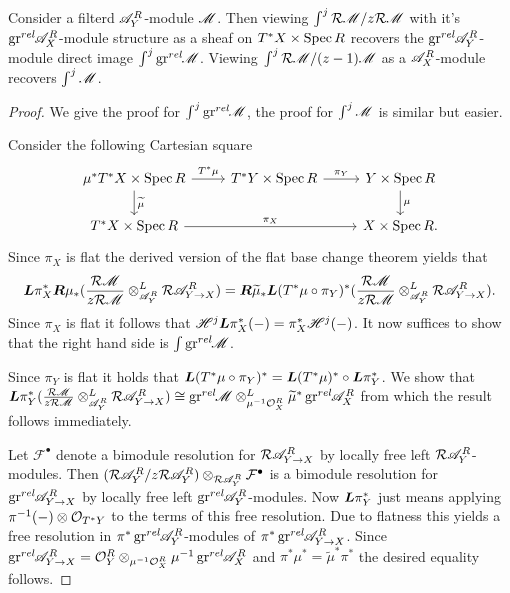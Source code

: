 \begin{lemma}\label{lem: ReesAndOtherDirectImagesAgree}
  Consider a filterd $\mathscr{A}_Y^R$-module $\mathscr{M}$. Then viewing $\int^j \mathcal{R}\mathscr{M} / z\mathcal{R}\mathscr{M}$ with it's $\operatorname{gr}^{rel}\mkern-5mu\mathscr{A}_X^R$-module structure as a sheaf on $T^*X\times \operatorname{Spec} R$ recovers the $\operatorname{gr}^{rel}\mkern-5mu\mathscr{A}_Y^R$-module direct image $\int^j \operatorname{gr}^{rel}\mkern-5mu\mathscr{M}$. Viewing  $\int^j \mathcal{R}\mathscr{M} / (z-1)\mathscr{M}$ as a $\mathscr{A}_X^R$-module recovers $\int^j \mathscr{M}$.
\end{lemma}
\begin{proof}
  We give the proof for $\int^j \operatorname{gr}^{rel}\mkern-5mu \mathscr{M}$, the proof for $\int^j \mathscr{M}$ is similar but easier.


  Consider the following Cartesian square
  $$
      \begin{tikzcd}
        \mu^*T^* X \times \Spec R \arrow{r}{T^*\mu} \arrow{d}{{\widetilde{\mu}}} &T^*Y\times \Spec R \arrow{r}{\pi_Y} & Y\times \Spec R\arrow{d}{\mu} \\
        T^*X\arrow{rr}{\pi_X}  \times \Spec R && X\times \Spec R.
      \end{tikzcd}
  $$
  Since $\pi_X$ is flat the derived version of the flat base change theorem yields that 
  $$\boldsymbol{L}\pi_X^*\boldsymbol{R}\mu_*(\frac{\mathcal{R}\mathscr{M}}{z\mathcal{R} \mathscr{M}}\otimes^L_{\mathscr{A}_Y^R}\mathcal{R} \mathscr{A}_{Y\to X}^R) = \boldsymbol{R}\widetilde{\mu}_*\boldsymbol{L}(T^*\mu\circ\pi_Y)^*(\frac{\mathcal{R}\mathscr{M}}{z\mathcal{R} \mathscr{M}}\otimes^L_{\mathscr{A}_Y^R}\mathcal{R} \mathscr{A}_{Y\to X}^R).$$
  Since $\pi_X$ is flat it follows that $\mathscr{H}^j \boldsymbol{L}\pi_X^*({-}) = \pi_X^*\mathscr{H}^j({-})$. It now suffices to show that the right hand side is $\int \operatorname{gr}^{rel}\mkern-5mu\mathscr{M}$.

  Since $\pi_Y$ is flat it holds that $\boldsymbol{L}(T^*\mu \circ \pi_Y)^* = \boldsymbol{L} (T^*\mu)^* \circ \boldsymbol{L} \pi_Y^*$.
  We show that $\boldsymbol{L}\pi_Y^*(\frac{\mathcal{R}\mathscr{M}}{z\mathcal{R} \mathscr{M}}\otimes^L_{\mathscr{A}_Y^R}\mathcal{R} \mathscr{A}_{Y\to X}^R)\cong \operatorname{gr}^{rel}\mkern-5mu\mathscr{M} \otimes^L_{\mu^{-1}\mathcal{O}_X^R}\widetilde{\mu}^*\operatorname{gr}^{rel}\mkern-5mu\mathscr{A}_{X}^R$ from which the result follows immediately.

  Let $\mathcal{F}^\bullet$ denote a bimodule resolution for $\mathcal{R} \mathscr{A}_{Y\to X}^R$ by locally free left $\mathcal{R}\mathscr{A}_Y^R$-modules.
  Then $(\mathcal{R} \mathscr{A}_Y^R / z\mathcal{R} \mathscr{A}_Y^R)\otimes_{\mathcal{R} \mathscr{A}_Y^R}\mathcal{F}^\bullet$ is a bimodule resolution for $\operatorname{gr}^{rel}\mkern-5mu \mathscr{A}_{Y\to X}^R$ by locally free left $\operatorname{gr}^{rel}\mkern-5mu\mathscr{A}_Y^R$-modules.
  Now $\boldsymbol{L}\pi_Y^*$ just means applying $\pi^{-1}({-})\otimes \mathcal{O}_{T^*Y}$ to the terms of this free resolution.
  Due to flatness this yields a free resolution in $\pi^{*}\operatorname{gr}^{rel}\mkern-5mu\mathscr{A}_Y^R$-modules of $\pi^* \operatorname{gr}^{rel}\mkern-5mu\mathscr{A}_{Y\to X}^R$.
  Since $\operatorname{gr}^{rel}\mkern-5mu \mathscr{A}_{Y\to X}^R = \mathcal{O}_Y^R \otimes_{\mu^{-1}\mathcal{O}_X^R} \mu^{-1}\operatorname{gr}^{rel}\mkern-5mu\mathscr{A}_X^R$ and $\pi^*\mu^* = \widetilde{\mu}^*\pi^*$ the desired equality follows. 
\end{proof}
